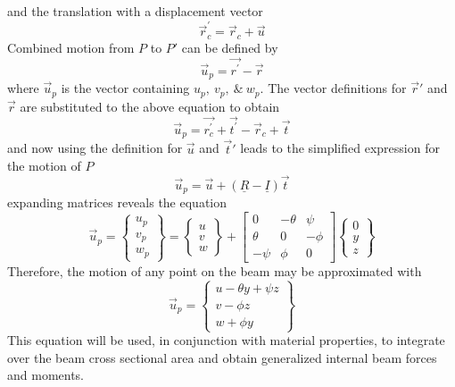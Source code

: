 and the translation with a displacement vector 
\begin{equation}\label{eq:rtrans}
\vec{r}_c^\prime=\vec{r}_c+\vec{u}
\end{equation}
Combined motion from $ P $ to $ P' $ can be defined by
\begin{equation}\label{eq:DispVectorrpr}
\vec{u}_p=\vec{r^\prime}-\vec{r}
\end{equation}
where $ \vec{u}_p  $ is the vector containing $ u_p,\:v_p,\:\&\:w_p $. The vector definitions for $ \vec{r}' $ and $ \vec{r} $ are substituted to the above equation to obtain
\begin{equation}\label{eq:DispVectorrptprt}
\vec{u}_p=\vec{r_c^\prime}+\vec{t^\prime}-\vec{r}_c+\vec{t}
\end{equation}
and now using the definition for $ \vec{u} $ and $ \vec{t}' $ leads to the simplified expression for the motion of $ P $
\begin{equation}\label{eq:DispVectRotTranst}
\vec{u}_p=\vec{u}+(\underline{R}-\underline{I})\vec{t}
\end{equation}
expanding matrices reveals the equation
\begin{equation}\label{DispVectExpanded}
\vec{u}_p = \left\{\begin{array}{c}
	u_p\\
	v_p\\
	w_p\end{array}\right\}=\left\{\begin{array}{c}
	u\\
	v\\
	w\end{array}\right\}+\left[\begin{array}{ccc}
	0&-\theta&\psi\\
	\theta&0&-\phi\\
	-\psi&\phi&0
	\end{array}\right]\left\{\begin{array}{c}
	0\\
	y\\
	z\end{array}\right\}
\end{equation}
Therefore, the motion of any point on the beam may be approximated with
\begin{equation}\label{eq:DispVectEvaluated}
\vec{u}_p=\left\{\begin{array}{c}
u-\theta y+\psi z\\
v-\phi z\\
w+\phi y\end{array}\right\}
\end{equation}
This equation will be used, in conjunction with material properties, to integrate over the beam cross sectional area and obtain generalized internal beam forces and moments.\par
